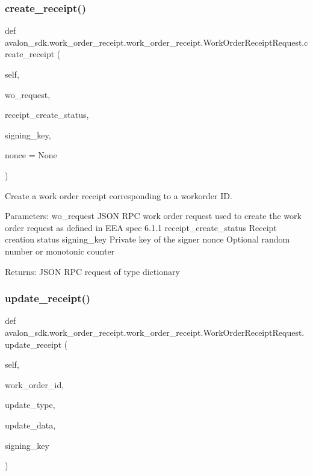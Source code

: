 \subsubsection{\texorpdfstring{create\+\_\+receipt()}{create\_receipt()}}
{\footnotesize\ttfamily def avalon\+\_\+sdk.\+work\+\_\+order\+\_\+receipt.\+work\+\_\+order\+\_\+receipt.\+Work\+Order\+Receipt\+Request.\+create\+\_\+receipt (\begin{DoxyParamCaption}\item[{}]{self,  }\item[{}]{wo\+\_\+request,  }\item[{}]{receipt\+\_\+create\+\_\+status,  }\item[{}]{signing\+\_\+key,  }\item[{}]{nonce = {\ttfamily None} }\end{DoxyParamCaption})}

\begin{DoxyVerb}Create a work order receipt corresponding to a workorder ID.

Parameters:
wo_request            JSON RPC work order request used to create the
              work order request as defined in EEA spec 6.1.1
receipt_create_status Receipt creation status
signing_key           Private key of the signer
nonce                 Optional random number or monotonic counter

Returns:
JSON RPC request of type dictionary
\end{DoxyVerb}
 \mbox{\label{classavalon__sdk_1_1work__order__receipt_1_1work__order__receipt_1_1WorkOrderReceiptRequest_a4dfaccb4caa8145a291d9c8d2bc33b34}} 
\subsubsection{\texorpdfstring{update\+\_\+receipt()}{update\_receipt()}}
{\footnotesize\ttfamily def avalon\+\_\+sdk.\+work\+\_\+order\+\_\+receipt.\+work\+\_\+order\+\_\+receipt.\+Work\+Order\+Receipt\+Request.\+update\+\_\+receipt (\begin{DoxyParamCaption}\item[{}]{self,  }\item[{}]{work\+\_\+order\+\_\+id,  }\item[{}]{update\+\_\+type,  }\item[{}]{update\+\_\+data,  }\item[{}]{signing\+\_\+key }\end{DoxyParamCaption})}

